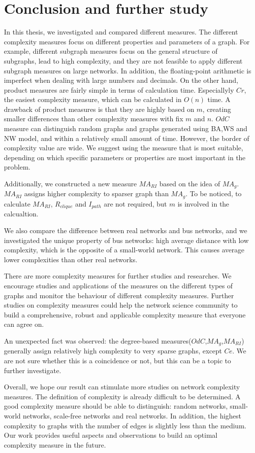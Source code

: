 \documentclass[12pt]{article}
\begin{document}
\section{Conclusion and further study}
In this thesis, we investigated and compared different measures. The different complexity measures focus on different properties and parameters of a graph. For example, different subgraph measures focus on the general structure of subgraphs, lead to high complexity, and they are not feasible to apply different subgraph measures on large networks. In addition, the floating-point arithmetic is imperfect when dealing with large numbers and decimals.
On the other hand, product measures are fairly simple in terms of calculation time. Especiallyly $Cr$, the easiest complexity measure, which can be calculated in $O(n)$ time\cite{KIM20082637}. A drawback of product measures is that they are highly based on $m$, creating smaller differences than other complexity measures with fix $m$ and $n$.
$OdC$ measure can distinguish random graphs and graphs generated using BA,WS and NW model, and within a relatively small amount of time. However, the border of complexity value are wide. We suggest using the measure that is most suitable, depending on which specific parameters or properties are most important in the problem.\par
Additionally, we constructed a new measure $MA_{RI}$ based on the idea of $MA_g$. $MA_{RI}$ assigns higher complexity to sparser graph than $MA_g$. To be noticed, to calculate $MA_{RI}$, $R_{clique}$ and $I_{path}$ are not required, but $m$ is involved in the calcualtion.\par
We also compare the difference between real networks and bus networks, and we investigated the unique property of bus networks: high average distance with low complexity, which is the opposite of a small-world network. This causes average lower complexities than other real networks.\par
There are more complexity measures \cite{emmert-streib_dehmer_2012}\cite{dehmer_barbarini_varmuza_graber_2009} for further studies and researches. We encourage studies and applications of the measures on the different types of graphs and monitor the behaviour of different complexity measures. Further studies on complexity measures could help the network science community to build a comprehensive, robust and applicable complexity measure that everyone can agree on.\par
An unexpected fact was observed: the degree-based measures($OdC$,$MA_g$,$MA_{RI}$) generally assign relatively high complexity to very sparse graphs, except $Ce$. We are not sure whether this is a coincidence or not, but this can be a topic to further investigate.\par
Overall, we hope our result can stimulate more studies on network complexity measures. The definition of complexity is already difficult to be determined. A good complexity measure should be able to distinguish: random networks, small-world networks, scale-free networks and real networks. In addition, the highest complexity to graphs with the number of edges is slightly less than the medium. Our work provides useful aspects and observations to build an optimal complexity measure in the future.
\end{document}
